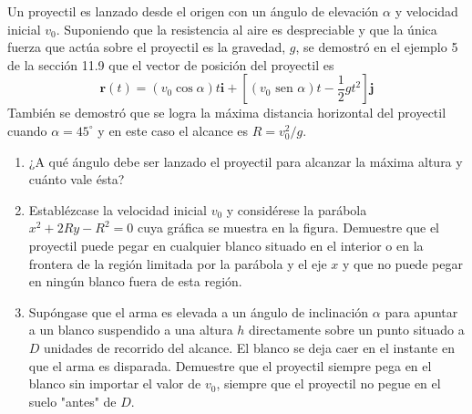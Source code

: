 \item Un proyectil es lanzado desde el origen con un ángulo de elevación $\alpha$ y velocidad inicial $v_0$. Suponiendo que la resistencia al aire es despreciable y que la única fuerza que actúa sobre el proyectil es la gravedad, $g$, se demostró en el ejemplo 5 de la sección 11.9 que el vector de posición del proyectil es
    \[
    \mathbf{r}(t) = (v_0 \cos \alpha) t \mathbf{i} + \left[ (v_0 \text{ sen } \alpha) t - \frac{1}{2} g t^2 \right] \mathbf{j}
    \]
    También se demostró que se logra la máxima distancia horizontal del proyectil cuando $\alpha = 45^\circ$ y en este caso el alcance es $R = v_0^2/g$.
    \begin{enumerate}
        \item ¿A qué ángulo debe ser lanzado el proyectil para alcanzar la máxima altura y cuánto vale ésta?
        \item Establézcase la velocidad inicial $v_0$ y considérese la parábola $x^2 + 2Ry - R^2 = 0$ cuya gráfica se muestra en la figura. Demuestre que el proyectil puede pegar en cualquier blanco situado en el interior o en la frontera de la región limitada por la parábola y el eje $x$ y que no puede pegar en ningún blanco fuera de esta región.
        \item Supóngase que el arma es elevada a un ángulo de inclinación $\alpha$ para apuntar a un blanco suspendido a una altura $h$ directamente sobre un punto situado a $D$ unidades de recorrido del alcance. El blanco se deja caer en el instante en que el arma es disparada. Demuestre que el proyectil siempre pega en el blanco sin importar el valor de $v_0$, siempre que el proyectil no pegue en el suelo "antes" de $D$.
    \end{enumerate}
